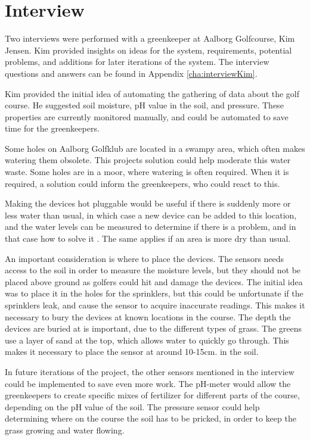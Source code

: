 \section{Interview}
Two interviews were performed with a greenkeeper at Aalborg Golfcourse, Kim Jensen. Kim provided insights on ideas for the system, requirements, potential problems, and additions for later iterations of the system. The interview questions and answers can be found in Appendix \ref{cha:interviewKim}. 

Kim provided the initial idea of automating the gathering of data about the golf course. He suggested soil moisture, pH value in the soil, and pressure. These properties are currently monitored manually, and could be automated to save time for the greenkeepers.

Some holes on Aalborg Golfklub are located in a swampy area, which often makes watering them obsolete. This projects solution could help moderate this water waste. Some holes are in a moor, where watering is often required. When it is required, a solution could inform the greenkeepers, who could react to this.

Making the devices hot pluggable would be useful if there is suddenly more or less water than usual, in which case a new device can be added to this location, and the water levels can be measured to determine if there is a problem, and in that case how to solve it . The same applies if an area is more dry than usual.

An important consideration is where to place the devices. The sensors needs access to the soil in order to measure the moisture levels, but they should not be placed above ground as golfers could hit and damage the devices. The initial idea was to place it in the holes for the sprinklers, but this could be unfortunate if the sprinklers leak, and cause the sensor to acquire inaccurate readings. This makes it necessary to bury the devices at known locations in the course. The depth the devices are buried at is important, due to the different types of grass. The greens use a layer of sand at the top, which allows water to quickly go through. This makes it necessary to place the sensor at around 10-15cm. in the soil.

In future iterations of the project, the other sensors mentioned in the interview could be implemented to save even more work. The pH-meter would allow the greenkeepers to create specific mixes of fertilizer for different parts of the course, depending on the pH value of the soil. The pressure sensor could help determining where on the course the soil has to be pricked, in order to keep the grass growing and water flowing.